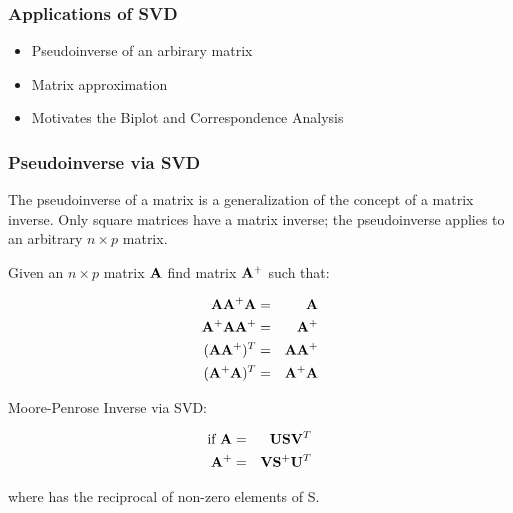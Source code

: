 \documentclass{beamer}
\begin{document}


\begin{frame}
  \frametitle{Applications of SVD}

\begin{itemize}
\item Pseudoinverse of an arbirary matrix
\item Matrix approximation
\item Motivates the Biplot and Correspondence Analysis
\end{itemize}

\end{frame}


\begin{frame}
  \frametitle{Pseudoinverse via SVD}

The pseudoinverse of a matrix is a generalization of the concept of a matrix inverse. Only square matrices have a matrix inverse; the pseudoinverse applies to an arbitrary $n \times p$ matrix.

\smallskip
Given an $n \times p$ matrix $\mathbf{A}$ find matrix $\mathbf{A}^{+}$ such that:

\begin{eqnarray*}
\mathbf{A} \mathbf{A}^{+} \mathbf{A} & = & \mathbf{A} \\
\mathbf{A}^{+} \mathbf{A} \mathbf{A}^{+} & = & \mathbf{A}^{+}\\
(\mathbf{A} \mathbf{A}^{+})^T & = & \mathbf{A} \mathbf{A}^{+}\\
(\mathbf{A}^{+} \mathbf{A})^T & = & \mathbf{A}^{+} \mathbf{A}
\end{eqnarray*}

\smallskip
Moore-Penrose Inverse via SVD:

\begin{eqnarray*}
\text{if}\ \mathbf{A} &=& \mathbf{U}\mathbf{S}\mathbf{V}^T \\
\mathbf{A}^{+} &=& \mathbf{V} \mathbf{S}^{+}  \mathbf{U}^T
\end{eqnarray*}

where  has the reciprocal of non-zero elements of S.

\end{frame}
\end{document}
